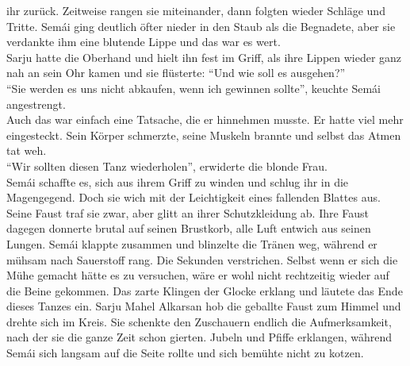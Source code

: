 ihr zurück. Zeitweise rangen sie miteinander, dann folgten wieder Schläge und Tritte. Semái ging 
deutlich öfter nieder in den Staub als die Begnadete, aber sie verdankte ihm eine blutende Lippe 
und das war es wert. \\
Sarju hatte die Oberhand und hielt ihn fest im Griff, als ihre Lippen wieder ganz nah an sein Ohr 
kamen und sie flüsterte: ``Und wie soll es ausgehen?''\\
``Sie werden es uns nicht abkaufen, wenn ich gewinnen sollte'', keuchte Semái angestrengt.\\
Auch das war einfach eine Tatsache, die er hinnehmen musste. Er hatte viel mehr eingesteckt. Sein 
Körper schmerzte, seine Muskeln brannte und selbst das Atmen tat weh.\\
``Wir sollten diesen Tanz wiederholen'', erwiderte die blonde Frau.\\
Semái schaffte es, sich aus ihrem Griff zu winden und schlug ihr in die Magengegend. Doch sie wich 
mit der Leichtigkeit eines fallenden Blattes aus. Seine Faust traf sie zwar, aber glitt an ihrer 
Schutzkleidung ab. Ihre Faust dagegen donnerte brutal auf seinen Brustkorb, alle Luft entwich aus 
seinen Lungen. Semái klappte zusammen und blinzelte die Tränen weg, während er mühsam nach 
Sauerstoff rang. Die Sekunden verstrichen. Selbst wenn er sich die Mühe gemacht hätte es zu 
versuchen, wäre er wohl nicht rechtzeitig wieder auf die Beine gekommen. Das zarte 
Klingen der Glocke erklang und läutete das Ende dieses Tanzes ein. Sarju Mahel Alkarsan hob die 
geballte Faust zum Himmel und drehte sich im Kreis. Sie schenkte den Zuschauern endlich die 
Aufmerksamkeit, nach der sie die ganze Zeit schon gierten. Jubeln und Pfiffe erklangen, während 
Semái sich langsam auf die Seite rollte und sich bemühte nicht zu kotzen. \\


